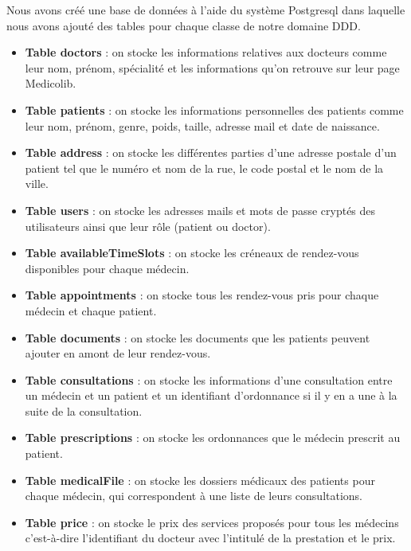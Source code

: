 \documentclass[a4paper]{report}
\begin{document}
Nous avons créé une base de données à l'aide du système Postgresql dans laquelle nous avons ajouté des tables pour chaque classe de notre domaine DDD.\newline
\begin{itemize}
    \item \textbf{Table doctors} : on stocke les informations relatives aux docteurs comme leur nom, prénom, spécialité et les informations qu'on retrouve sur leur page Medicolib.\newline
    \item \textbf{Table patients} : on stocke les informations personnelles des patients comme leur nom, prénom, genre, poids, taille, adresse mail et date de naissance. \newline
    \item \textbf{Table address} : on stocke les différentes parties d'une adresse postale d'un patient tel que le numéro et nom de la rue, le code postal et le nom de la ville. \newline
    \item \textbf{Table users} : on stocke les adresses mails et mots de passe cryptés des utilisateurs ainsi que leur rôle (patient ou doctor). \newline
    \item \textbf{Table availableTimeSlots} : on stocke les créneaux de rendez-vous disponibles pour chaque médecin. \newline
    \item \textbf{Table appointments} : on stocke tous les rendez-vous pris pour chaque médecin et chaque patient. \newline
    \item \textbf{Table documents} : on stocke les documents que les patients peuvent ajouter en amont de leur rendez-vous. \newline
    \item \textbf{Table consultations} : on stocke les informations d'une consultation entre un médecin et un patient et un identifiant d'ordonnance si il y en a une à la suite de la consultation. \newline
    \item \textbf{Table prescriptions} : on stocke les ordonnances que le médecin prescrit au patient. \newline
    \item \textbf{Table medicalFile} :  on stocke les dossiers médicaux des patients pour chaque médecin, qui correspondent à une liste de leurs consultations. \newline
    \item \textbf{Table price} : on stocke le prix des services proposés pour tous les médecins c'est-à-dire l'identifiant du docteur avec l'intitulé de la prestation et le prix. \newline
\end{itemize}
\end{document}
